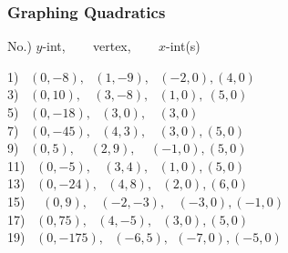\documentclass[11pt]{book}
\newcommand{\tmstrong}[1]{\textbf{#1}}
\theoremstyle{definition}  %
\begin{document}
\subsubsection{Graphing Quadratics}

\begin{center}
No.) $y$-int, ~~~ vertex, ~~~ $x$-int(s)
\end{center}
\begin{multicols}{2}
	1)~ $(0,-8), ~~~ (1,-9), ~~~ (-2,0), (4,0)$\\
  3)~ $(0,10), ~~~~ (3,-8), ~~~ (1,0), ~(5,0)$\\
  5)~ $(0,-18), ~~~ (3,0), ~~~~ (3,0)$\\
  7)~ $(0,-45), ~~~ (4,3), ~~~~ (3,0), (5,0)$\\
  9)~ $(0,5), ~~~~~ (2,9), ~~~~~ (-1,0), (5,0)$\\
  11)~ $(0,-5), ~~~~ (3,4), ~~~ (1,0), (5,0)$\\
  13)~ $(0,-24), ~~~ (4,8), ~~~ (2,0), (6,0)$\\
  15)~~ $(0,9), ~~~~ (-2,-3), ~~~~ (-3,0), (-1,0)$\\
  17)~ $(0,75), ~~~ (4,-5), ~~~ (3,0), (5,0)$\\
  19)~ $(0,-175), ~~~ (-6,5), ~~ (-7,0), (-5,0)$%
\end{multicols}
\end{document}
